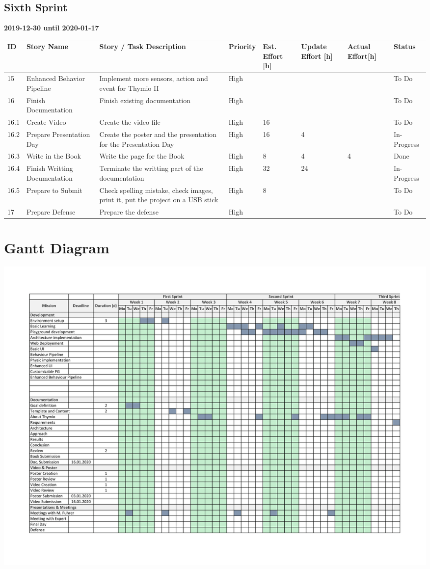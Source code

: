 \documentclass{scrbook}
\begin{document}
\section{Sixth Sprint}
\textbf{2019-12-30 until 2020-01-17}
\begin{longtable}{p{5mm}|p{2cm}|p{4cm}|p{1cm}|p{1cm}|p{1cm}|p{1cm}|p{15mm}}
  ID                     & Story Name & Story / Task Description & Priority & Est. Effort {[}h{]} & Update Effort {[}h{]} & Actual Effort{[}h{]} & Status                \\ \hline
  15 & Enhanced Behavior Pipeline & Implement more sensors, action and event for Thymio II & High &  &  &  & To Do \\ 
  16 & Finish Documentation & Finish existing documentation & High &  &  &  & To Do \\
  16.1 & Create Video & Create the video file & High & 16 &  &  & To Do \\ 
  16.2 & Prepare Presentation Day & Create the poster and the presentation for the Presentation Day & High & 16 & 4 &  & In-Progress \\
  16.3 & Write in the Book & Write the page for the Book & High & 8 & 4 & 4 & Done \\ 
  16.4 & Finish Writting Documentation & Terminate the writting part of the documentation & High & 32 & 24 &  & In-Progress \\ 
  16.5 & Prepare to Submit & Check spelling mistake, check images, print it, put the project on a USB stick & High & 8 &  &  & To Do\\ 
  17 & Prepare Defense & Prepare the defense & High &  &  &  & To Do \\ \hline
\end{longtable}

\chapter{Gantt Diagram}

\begin{center}
  \includegraphics[scale = 0.28, angle=-90]{./Gantt-1}
\end{center}
\end{document}
